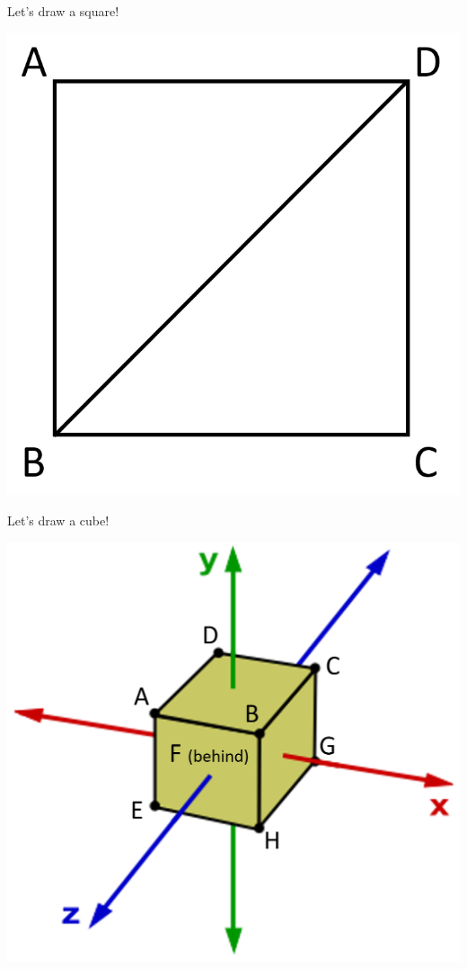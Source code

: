 \begin{frame}{Let's draw a square!}
	\begin{center}
		\includegraphics[height=0.8\textheight]{square_vertices}
	\end{center}
\end{frame}

\begin{frame}{Let's draw a cube!}
	\begin{center}
		\includegraphics[height=0.8\textheight]{cube_vertices}
	\end{center}
\end{frame}

